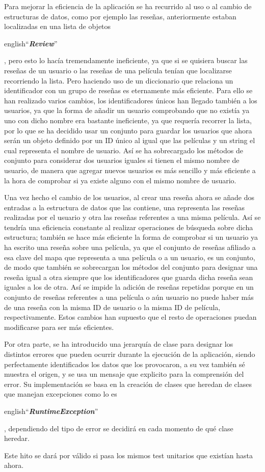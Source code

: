 Para mejorar la eficiencia de la aplicación se ha recurrido al uso o al cambio de estructuras de datos, como por 
ejemplo las reseñas, anteriormente estaban localizadas en una lista de objetos 
\begin{otherlanguage} {english}``\textit{\textbf{Review}}''\end{otherlanguage}, 
pero esto lo hacía tremendamente ineficiente, ya que si se quisiera buscar las reseñas de un usuario o las reseñas 
de una película tenían que localizarse recorriendo la lista. Pero haciendo uso de un diccionario\cite{OaksJava} que 
relaciona un identificador con un grupo de reseñas es eternamente más eficiente. Para ello se han realizado varios 
cambios, los identificadores únicos han llegado también a los usuarios, ya que la forma de añadir un usuario 
comprobando que no existía ya uno con dicho nombre era bastante ineficiente, ya que requería recorrer la lista, por 
lo que se ha decidido usar un conjunto para guardar los usuarios que ahora serán un objeto definido por un ID único 
al igual que las películas y un string el cual representa el nombre de usuario. Así se ha sobrecargado los métodos 
de conjunto para considerar dos usuarios iguales si tienen el mismo nombre de usuario, de manera que agregar nuevos 
usuarios es más sencillo y más eficiente a la hora de comprobar si ya existe alguno con el mismo nombre de usuario.

Una vez hecho el cambio de los usuarios, al crear una reseña ahora se añade dos entradas a la estructura de datos 
que las contiene, una representa las reseñas realizadas por el usuario y otra las reseñas referentes a una misma 
película. Así se tendría una eficiencia constante al realizar operaciones de búsqueda sobre dicha estructura; 
también se hace más eficiente la forma de comprobar si un usuario ya ha escrito una reseña sobre una película, ya 
que el conjunto de reseñas afiliado a esa clave del mapa que representa a una película o a un usuario, es un 
conjunto, de modo que también se sobrecargan los métodos del conjunto para designar una reseña igual a otra siempre 
que los identificadores que guarda dicha reseña sean iguales a los de otra. Así se impide la adición de reseñas 
repetidas porque en un conjunto de reseñas referentes a una película o aún usuario no puede haber más de una reseña 
con la misma ID de usuario o la misma ID de película, respectivamente. Estos cambios han supuesto que el resto de 
operaciones puedan modificarse para ser más eficientes.

Por otra parte, se ha introducido una jerarquía de clase para designar los distintos errores que pueden ocurrir
durante la ejecución de la aplicación, siendo perfectamente identificados los datos que los provocaron, a su vez 
también sé muestra el origen, y se usa un mensaje que explicito para la comprensión del error. Su implementación se 
basa en la creación de clases que heredan de clases que manejan excepciones como lo es 
\begin{otherlanguage} {english}``\textit{\textbf{RuntimeException}}''\end{otherlanguage}, 
dependiendo del tipo de error se decidirá en cada momento de qué clase heredar.

Este hito se dará por válido si pasa los mismos test unitarios que existían hasta ahora.